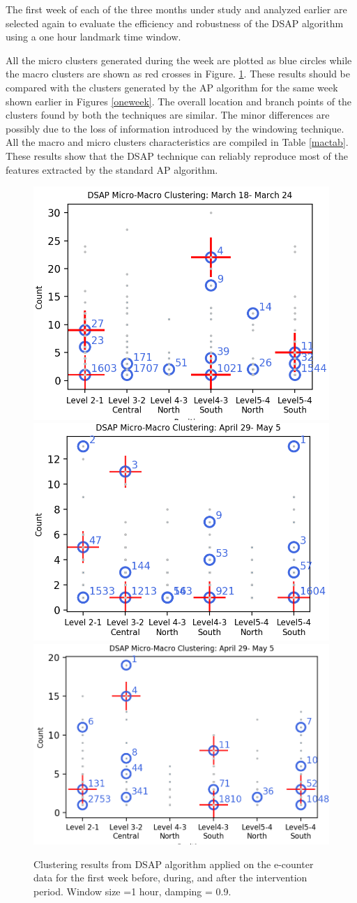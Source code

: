 The first week of each of the three months under study and analyzed earlier are selected again to evaluate the efficiency and robustness of the DSAP algorithm using a one hour landmark time window. 

All the micro clusters generated during the week are plotted as blue circles while the macro clusters are shown as red crosses in Figure. \ref{dsap3week}. These results should be compared with the clusters generated by the AP algorithm for the same week shown earlier in Figures \ref{oneweek}. The overall location and branch points of the clusters found by both the techniques are similar. The minor differences are possibly due to the loss of information introduced by the windowing technique. All the macro and micro clusters characteristics are compiled in Table \ref{mactab}. These results show that the DSAP technique can reliably reproduce most of the features extracted by the standard AP algorithm. 


\begin{figure}[!t]
    \centering
    \includegraphics[width=.47\textwidth]{image/Chapters/Chapter6/beforeInte1week.png}
    \includegraphics[width=.5\textwidth]{image/Chapters/Chapter6/duringInte1week.png}
    \includegraphics[width=.5\textwidth]{image/Chapters/Chapter6/afterInte1week.png}
    \caption{Clustering results from DSAP algorithm applied on the e-counter data for the first week before, during, and after the intervention period. Window size =1 hour, damping = 0.9.}
    \label{dsap3week}
\end{figure}


